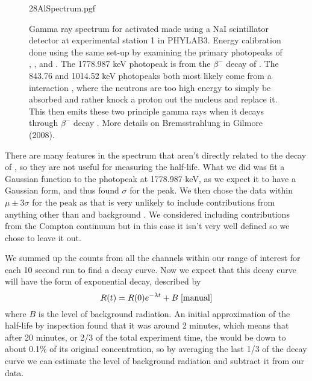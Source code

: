 \documentclass[11pt]{article}
\numberwithin{equation}{section}
\numberwithin{figure}{section}
\numberwithin{table}{section}
\begin{document}
\begin{figure}[H]
    \begin{center}
       {28AlSpectrum.pgf}
       \caption{Gamma ray spectrum for activated  made using a NaI scintillator detector at experimental station 1 in PHYLAB3. Energy calibration done using the same set-up by examining the primary photopeaks of  \cite{137Cs},  \cite{22Na}, and  \cite{60Co}. The 1778.987 keV photopeak is from the $\beta^-$ decay of  \cite{28Al}. The 843.76 and 1014.52 keV photopeaks both most likely come from a  interaction \cite{geneseo}, where the neutrons are too high energy to simply be absorbed and rather knock a proton out the nucleus and replace it. This  then emits these two principle gamma rays when it decays through $\beta^-$ decay \cite{27Mg}. More details on Bremsstrahlung in Gilmore (2008).}
       \label{fig:Spectrum}
    \end{center}
\end{figure}
\par There are many features in the spectrum that aren't directly related to the decay of , so they are not useful for measuring the half-life. What we did was fit a Gaussian function to the photopeak at 1778.987 keV, as we expect it to have a Gaussian form, and thus found $\sigma$ for the peak. We then chose the data within $\mu\pm3\sigma$ for the peak as that is very unlikely to include contributions from anything other than  and background \cite{geneseo}. We considered including contributions from the Compton continuum but in this case it isn't very well defined so we chose to leave it out.
\par We summed up the counts from all the channels within our range of interest for each 10 second run to find a decay curve. Now we expect that this decay curve will have the form of exponential decay, described by
\begin{equation}
    R(t)=R(0)e^{-\lambda t}+B\;\cite{manual}
    \label{eqn:exp decay}
\end{equation}
where $B$ is the level of background radiation. An initial approximation of the half-life by inspection found that it was around 2 minutes, which means that after 20 minutes, or 2/3 of the total experiment time, the  would be down to about 0.1\% of its original concentration, so by averaging the last 1/3 of the decay curve we can estimate the level of background radiation and subtract it from our data. 
\end{document}
